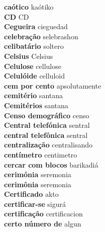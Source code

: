 \textbf{ caótico  } kaótiko \\
\textbf{ CD  } CD \\
\textbf{ Cegueira  } cieguedad \\
\textbf{ celebração  } selebrashon \\
\textbf{ celibatário  } soltero \\
\textbf{ Celsius  } Celsius \\
\textbf{ Celulose  } cellulose \\
\textbf{ Celulóide  } celluloid \\
\textbf{ cem por cento  } apsolutamente \\
\textbf{ cemitério  } santana \\
\textbf{ Cemitérios  } santana \\
\textbf{ Censo demográfico  } censo \\
\textbf{ Central telefónica  } sentral \\
\textbf{ central telefônica  } sentral \\
\textbf{ centralização  } centralisando \\
\textbf{ centímetro  } centimetro \\
\textbf{ cercar com blocos  } barikadiá \\
\textbf{ cerimónia  } seremonia \\
\textbf{ cerimônia  } seremonia \\
\textbf{ Certificado  } akto \\
\textbf{ certificar-se  } sigurá \\
\textbf{ certificação  } certificacion \\
\textbf{ certo número de  } algun \\
